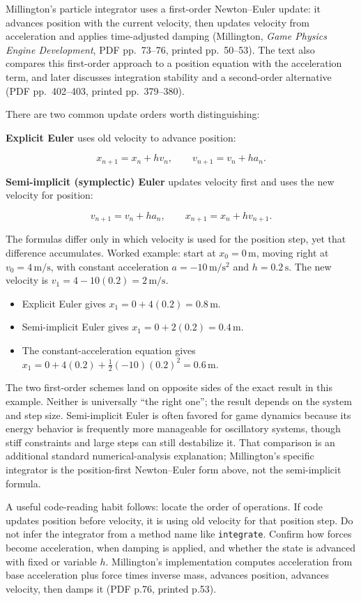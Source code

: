 Millington's particle integrator uses a first-order Newton--Euler update: it advances position with the current velocity, then updates velocity from acceleration and applies time-adjusted damping (Millington, \emph{Game Physics Engine Development}, PDF pp.~73--76, printed pp.~50--53). The text also compares this first-order approach to a position equation with the acceleration term, and later discusses integration stability and a second-order alternative (PDF pp.~402--403, printed pp.~379--380).

There are two common update orders worth distinguishing:

\textbf{Explicit Euler} uses old velocity to advance position:

\[
x_{n+1}=x_n+h v_n, \qquad v_{n+1}=v_n+h a_n.
\]

\textbf{Semi-implicit (symplectic) Euler} updates velocity first and uses the new velocity for position:

\[
v_{n+1}=v_n+h a_n, \qquad x_{n+1}=x_n+h v_{n+1}.
\]

The formulas differ only in which velocity is used for the position step, yet that difference accumulates. Worked example: start at \(x_0=0\,\mathrm{m}\), moving right at \(v_0=4\,\mathrm{m/s}\), with constant acceleration \(a=-10\,\mathrm{m/s^2}\) and \(h=0.2\,\mathrm{s}\). The new velocity is \(v_1=4-10(0.2)=2\,\mathrm{m/s}\).

\begin{itemize}
\tightlist
\item
  Explicit Euler gives \(x_1=0+4(0.2)=0.8\,\mathrm{m}\).
\item
  Semi-implicit Euler gives \(x_1=0+2(0.2)=0.4\,\mathrm{m}\).
\item
  The constant-acceleration equation gives \(x_1=0+4(0.2)+\frac12(-10)(0.2)^2=0.6\,\mathrm{m}\).
\end{itemize}

The two first-order schemes land on opposite sides of the exact result in this example. Neither is universally ``the right one''; the result depends on the system and step size. Semi-implicit Euler is often favored for game dynamics because its energy behavior is frequently more manageable for oscillatory systems, though stiff constraints and large steps can still destabilize it. That comparison is an additional standard numerical-analysis explanation; Millington's specific integrator is the position-first Newton--Euler form above, not the semi-implicit formula.

A useful code-reading habit follows: locate the order of operations. If code updates position before velocity, it is using old velocity for that position step. Do not infer the integrator from a method name like \texttt{integrate}. Confirm how forces become acceleration, when damping is applied, and whether the state is advanced with fixed or variable \(h\). Millington's implementation computes acceleration from base acceleration plus force times inverse mass, advances position, advances velocity, then damps it (PDF p.76, printed p.53).


